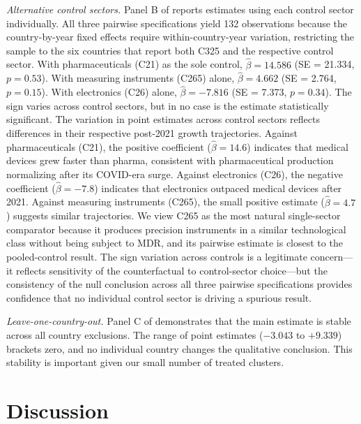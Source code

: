\documentclass[12pt]{article}
\begin{document}
\textit{Alternative control sectors.} Panel B of  reports estimates using each control sector individually. All three pairwise specifications yield 132 observations because the country-by-year fixed effects require within-country-year variation, restricting the sample to the six countries that report both C325 and the respective control sector. With pharmaceuticals (C21) as the sole control, $\hat{\beta} = 14.586$ (SE = 21.334, $p = 0.53$). With measuring instruments (C265) alone, $\hat{\beta} = 4.662$ (SE = 2.764, $p = 0.15$). With electronics (C26) alone, $\hat{\beta} = -7.816$ (SE = 7.373, $p = 0.34$). The sign varies across control sectors, but in no case is the estimate statistically significant. The variation in point estimates across control sectors reflects differences in their respective post-2021 growth trajectories. Against pharmaceuticals (C21), the positive coefficient ($\hat{\beta} = 14.6$) indicates that medical devices grew faster than pharma, consistent with pharmaceutical production normalizing after its COVID-era surge. Against electronics (C26), the negative coefficient ($\hat{\beta} = -7.8$) indicates that electronics outpaced medical devices after 2021. Against measuring instruments (C265), the small positive estimate ($\hat{\beta} = 4.7$) suggests similar trajectories. We view C265 as the most natural single-sector comparator because it produces precision instruments in a similar technological class without being subject to MDR, and its pairwise estimate is closest to the pooled-control result. The sign variation across controls is a legitimate concern---it reflects sensitivity of the counterfactual to control-sector choice---but the consistency of the null conclusion across all three pairwise specifications provides confidence that no individual control sector is driving a spurious result.

\textit{Leave-one-country-out.} Panel C of  demonstrates that the main estimate is stable across all country exclusions. The range of point estimates ($-3.043$ to $+9.339$) brackets zero, and no individual country changes the qualitative conclusion. This stability is important given our small number of treated clusters.





\section{Discussion}
\label{sec:discussion}
\end{document}
